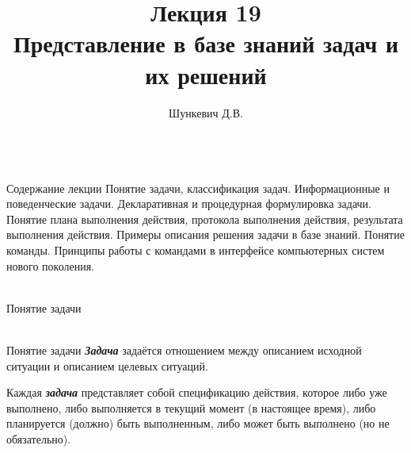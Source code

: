 \title{Лекция 19\\Представление в базе знаний задач и их решений}
\author[]{Шункевич Д.В.}

\begin{frame}
	\titlepage
\end{frame}

\begin{frame}{\\Содержание лекции}
	\topline
	\justifying
	Понятие задачи, классификация задач. Информационные и поведенческие задачи. Декларативная и процедурная формулировка задачи. Понятие плана выполнения действия, протокола выполнения действия, результата выполнения действия. Примеры описания решения задачи в базе знаний. Понятие команды. Принципы работы с командами в интерфейсе компьютерных систем нового поколения. 
\end{frame}

\begin{frame}{\\Понятие задачи}
	\topline
	\justifying
    \begin{SCn}
    \end{SCn}
\end{frame}

\begin{frame}{\\Понятие задачи}
	\topline
	\justifying
    \textbf{\textit{Задача}} задаётся отношением  между описанием исходной ситуации и описанием целевых ситуаций.\\
    
    \bigskip
    
    Каждая \textbf{\textit{задача}} представляет собой спецификацию действия, которое либо уже выполнено, либо выполняется в текущий момент (в настоящее время), либо планируется (должно) быть выполненным, либо может быть выполнено (но не обязательно). 
\end{frame}


